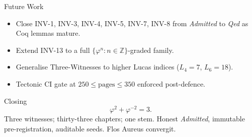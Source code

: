 \documentclass[10pt,aspectratio=169]{beamer}
\begin{document}
\begin{frame}{Future Work}
  \begin{itemize}
    \item Close INV-1, INV-3, INV-4, INV-5, INV-7, INV-8 from \emph{Admitted} to \emph{Qed} as Coq lemmas mature.
    \item Extend INV-13 to a full $\{\varphi^{n}\!:\!n\in\mathbb{Z}\}$-graded family.
    \item Generalise Three-Witnesses to higher Lucas indices ($L_{4}=7$, $L_{6}=18$).
    \item Tectonic CI gate at $250 \leq \text{pages}\leq 350$ enforced post-defence.
  \end{itemize}
\end{frame}

\begin{frame}{Closing}
  \[
    \varphi^{2}+\varphi^{-2}=3.
  \]
  Three witnesses; thirty-three chapters; one stem.
  Honest \emph{Admitted}, immutable pre-registration, auditable seeds.
  Flos Aureus convergit.
\end{frame}
\end{document}
